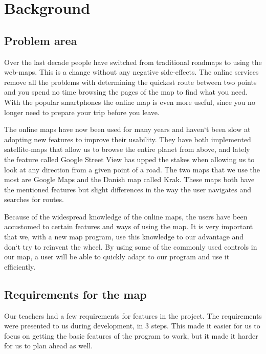 \chapter{Background}
\label{BG}
\section{Problem area}
\label{BG-PR}
Over the last decade people have switched from traditional roadmaps 
to using the web-maps. This is a change without any negative side-effects. 
The online services remove all the problems with determining the quickest 
route between two points and you spend no time browsing the pages of 
the map to find what you need. With the popular smartphones the online 
map is even more useful, since you no longer need to prepare your trip 
before you leave.

The online maps have now been used for many years and haven`t been slow 
at adopting new features to improve their usability. They have both 
implemented satellite-maps that allow us to browse the entire planet 
from above, and lately the feature called Google Street View has upped 
the stakes when allowing us to look at any direction from a given point 
of a road. The two maps that we use the most are Google Maps and the 
Danish map called Krak. These maps both have the mentioned features 
but slight differences in the way the user navigates and searches 
for routes.

Because of the widespread knowledge of the online maps, the users 
have been accustomed to certain features and ways of using the map. 
It is very important that we, with a new map program, use this knowledge 
to our advantage and don`t try to reinvent the wheel. By using some 
of the commonly used controls in our map, a user will be able to quickly 
adapt to our program and use it efficiently. 

\section{Requirements for the map}
\label{BG-R}
Our teachers had a few requirements for features in the project. The requirements were presented to us during development, in 3 steps. This made
it easier for us to focus on getting the basic features of the program to work,
but it made it harder for us to plan ahead as well.

